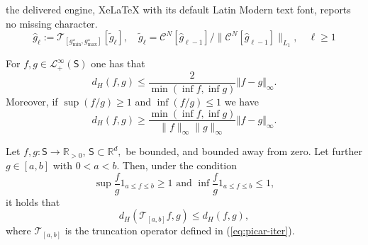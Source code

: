 \documentclass[10pt,a4paper]{amsart}
\begin{document}
the delivered engine, XeLaTeX with its default Latin Modern text font, reports no missing character.
\begin{equation}
\label{eq:picar-iter}
\widehat{g}%
_{\ell}:=\mathcal{T}_{[g^{\star}_{\min},g^{\star}_{\max}]}[\widetilde g_\ell], \quad \widetilde g_\ell=\mathcal{C}^{N}[\widehat{g}_{\ell-1}]/\|\mathcal{C}^{N}[\widehat{g}_{\ell-1}]\|_{L_1}, \quad \ell\geq1
\end{equation}

\begin{lemma}
\label{lemH} For $f,g\in\mathcal{L}_{+}^{\infty}(\mathsf{S})$  one has that%
\[
 d_{H}(f,g)\leq\frac{2}{\min(\inf f,\inf g)}\left\Vert f-g\right\Vert _{\infty}.
\]
Moreover, if $\sup(f/g)\geq 1$  and $\inf(f/g)\leq 1$ we have
\[
d_{H}(f,g)\geq \frac{\min(\inf f,\inf g)}{\|f\|_{\infty}\|g\|_{\infty}}\left\Vert f-g\right\Vert _{\infty}. 
\]
\end{lemma}

\begin{lemma}\label{Dhineq}
Let $f,g:\mathsf{S}\rightarrow\mathbb{R}_{>0}$, $\mathsf{S}\subset\mathbb{R}^{d},$ be bounded,
and bounded away from zero. Let further $g\in\left[  a,b\right]  $ with
$0<a<b.$ Then, under the condition%
\begin{equation}
\sup\frac{f}{g}1_{a\leq f\leq b}\geq1\text{ \ \ and \ }\inf\frac{f}{g}1_{a\leq
f\leq b}\leq1,\label{Hmcon}%
\end{equation}
it holds that%
\begin{equation}
d_{H}(\mathcal{T}_{\left[  a,b\right]  }f,g)\leq d_{H}(f,g),\label{Hmineq}%
\end{equation}
where $\mathcal{T}_{\left[  a,b\right]  }$ is the truncation operator defined
in (\ref{eq:picar-iter}). 
\end{lemma}
\end{document}
